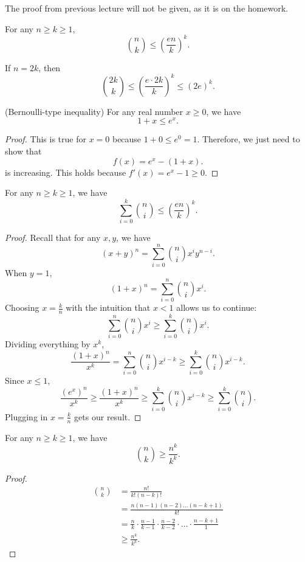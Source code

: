 
The proof from previous lecture will not be given, as it is on the homework.

\begin{lemma}
	For any \( n\ge k\ge 1 \), \[
		\binom{n}{k} \le \left( \frac{en}{k} \right) ^{k} 
	.\] 
\end{lemma}

\begin{observation}
	If \( n=2k \), then \[
		\binom{2k}{k} \le \left( \frac{e\cdot 2k}{k} \right)^{k}  \le (2e)^{k} 
	.\] 
\end{observation}

\begin{lemma}
	(Bernoulli-type inequality) For any real number \( x\ge 0 \), we have \[
		1 + x \le e^{x} 
	.\] 
\end{lemma}
\begin{proof}
	This is true for \( x=0 \) because \( 1 + 0 \le e^{0} = 1 \). Therefore, we just need to show that \[
		f(x) = e^{x} - (1+x) 
	.\] is increasing. This holds because \( f'(x) = e^{x}-1\ge 0  \).
\end{proof}

\begin{lemma}
	For any \( n\ge k\ge 1 \), we have \[
		\sum_{i=0}^{k} \binom{n}{i}\le \left( \frac{en}{k}  \right) ^{k} 
	.\]
\end{lemma}
\begin{proof}
	Recall that for any \( x,y \), we have \[
		(x+y)^{n} = \sum_{i=0}^{n} \binom{n}{i}x^{i}y^{n-i}  
	.\] When \( y = 1 \), \[
		(1+x)^{n} = \sum_{i=0}^{n} \binom{n}{i}x^{i}  
	.\] Choosing \( x=\frac{k}{n} \) with the intuition that \( x < 1 \) allows us to continue:
	\[
		\sum_{i=0}^{n} \binom{n}{i}x^{i}\ge \sum_{i=0}^{k} \binom{n}{i}x^{i}  
	.\] Dividing everything by \( x^{k}  \), \[
		\frac{(1+x)^{n} }{x^{k} } = \sum_{i=0}^{n} \binom{n}{i}x^{i-k} \ge \sum_{i=0}^{k} \binom{n}{i}x^{i-k} 
	.\] Since \( x \le 1 \), \[
	\frac{(e^{x})^{n}  }{x^{k}  } \ge  \frac{(1+x)^{n} }{x^k } \ge \sum_{i=0}^{k} \binom{n}{i}x^{i-k} \ge \sum_{i=0}^{k} \binom{n}{i} 
	.\] Plugging in \( x = \frac{k}{n} \) gets our result.
\end{proof}

\begin{lemma}
	For any \( n\ge k\ge 1 \), we have \[
		\binom{n}{k} \ge \frac{n^{k}}{k^{k} } 
	.\] 
\end{lemma}
\begin{proof}
	\begin{align*}
		\binom{n}{k} &= \frac{n!}{k!(n-k)!} \\
		&= \frac{n(n-1)(n-2)\ldots (n-k+1)}{k!} \\
		&= \frac{n}{k}\cdot \frac{n-1}{k-1} \cdot \frac{n-2}{k-2} \cdot \ldots \cdot  \frac{n-k+1}{1} \\
		&\ge \frac{n^{k}}{k^{k} }
	.\end{align*}
\end{proof}
